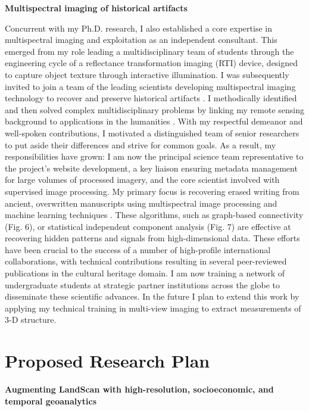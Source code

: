 \documentclass[letterpaper,sans]{moderncv}
\begin{document}
\begin{paracol}{2}
\begin{leftcolumn}
\textbf{Multispectral imaging of historical artifacts}

Concurrent with my Ph.D. research, I also established a core expertise in multispectral imaging and exploitation as an independent consultant. This emerged from my role leading a multidisciplinary team of students through the engineering cycle of a reflectance transformation imaging (RTI) device, designed to capture object texture through interactive illumination. I was subsequently invited to join a team of the leading scientists developing multispectral imaging technology to recover and preserve historical artifacts \cite{easton2013imaging}. I methodically identified and then solved complex multidisciplinary problems by linking my remote sensing background to applications in the humanities . With my respectful demeanor and well-spoken contributions, I motivated a distinguished team of senior researchers to put aside their differences and strive for common goals.  As a result, my responsibilities have grown: I am now the principal science team representative to the project's website development, a key liaison ensuring metadata management for large volumes of processed imagery, and the core scientist involved with supervised image processing. My primary focus is recovering erased writing from ancient, overwritten manuscripts using multispectral image processing and machine learning techniques \cite{easton2013statistical}. These algorithms, such as graph-based connectivity (Fig. 6), or statistical independent component analysis (Fig. 7) are effective at recovering hidden patterns and signals from high-dimensional data. These efforts have been crucial to the success of a number of high-profile international collaborations, with technical contributions resulting in several peer-reviewed publications in the cultural heritage domain. I am now training a network of undergraduate students at strategic partner institutions across the globe to disseminate these scientific advances. In the future I plan to extend this work by applying my technical training in multi-view imaging to extract measurements of 3-D structure. 

\newpage
\section{Proposed Research Plan}

\textbf{Augmenting LandScan with high-resolution, socioeconomic, and temporal geoanalytics}
\vspace{.2cm}


\end{leftcolumn}
\end{paracol}
\end{document}
